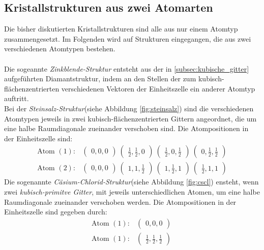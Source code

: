 \subsection{Kristallstrukturen aus zwei Atomarten}
\label{subsec:2atome}
Die bisher diskutierten Kristallstrukturen sind alle aus nur
einem Atomtyp zusammengesetzt. Im Folgenden wird auf Strukturen
eingegangen, die aus zwei verschiedenen Atomtypen bestehen.\\ \\
Die sogeannte \textit{Zinkblende-Struktur} entsteht aus der
in \ref{subsec:kubische_gitter}
aufgeführten Diamantstruktur, indem an den Stellen der zum
kubisch-flächenzentrierten verschiedenen Vektoren der Einheitszelle
ein anderer Atomtyp auftritt.\\
Bei der \textit{Steinsalz-Struktur}(siehe Abbildung \ref{fig:steinsalz})
sind die verschiedenen Atomtypen
jeweils in zwei kubisch-flächenzentrierten Gittern angeordnet, die um eine
halbe Raumdiagonale zueinander verschoben sind. Die Atompositionen
in der Einheitszelle sind:
\begin{align}
  \label{eqn:5}
  \text{Atom }(1) :&
  \begin{pmatrix}
    0, 0, 0
  \end{pmatrix}\
  \begin{pmatrix}
    \frac{1}{2}, \frac{1}{2}, 0
  \end{pmatrix}\
  \begin{pmatrix}
    \frac{1}{2}, 0, \frac{1}{2}
  \end{pmatrix}\
  \begin{pmatrix}
    0, \frac{1}{2}, \frac{1}{2}
  \end{pmatrix}\\
  \label{eqn:6}
  \text{Atom }(2) :&
  \begin{pmatrix}
    0, 0, 0
  \end{pmatrix}\
  \begin{pmatrix}
    1, 1, \frac{1}{2}
  \end{pmatrix}\
  \begin{pmatrix}
    1, \frac{1}{2}, 1
  \end{pmatrix}\
  \begin{pmatrix}
    \frac{1}{2}, 1, 1
   \end{pmatrix}
\end{align}
Die sogenannte \textit{Cäsium-Chlorid-Struktur}(siehe Abbildung \ref{fig:cscl})
ensteht, wenn zwei \textit{kubisch-primitve Gitter}, mit jeweils
unterschiedlichen Atomen, um eine halbe Raumdiagonale zueinander
verschoben werden. Die Atompositionen in der Einheitszelle
sind gegeben durch:
\begin{align}
  \label{eqn:7}
  \text{Atom }(1) :&
  \begin{pmatrix}
    0, 0, 0
  \end{pmatrix}\\
  \label{eqn:8}
  \text{Atom }(1) :&
  \begin{pmatrix}
    \frac{1}{2}, \frac{1}{2}, \frac{1}{2}
  \end{pmatrix}\
\end{align}
